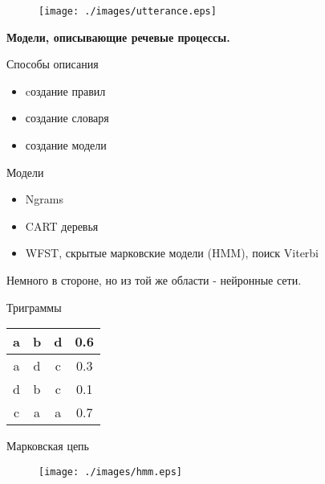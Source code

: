 \documentclass{seminar}
\begin{document}
\begin{slide}

\begin{figure}
\begin{center}
\texttt{[image: ./images/utterance.eps]}
\end{center}
\end{figure}

\end{slide}
\begin{slide}
    
{\bf Модели, описывающие речевые процессы.}

Способы описания

\begin{itemize}
\item cоздание правил
\item создание словаря
\item создание модели
\end{itemize}

Модели

\begin{itemize}
\item Ngrams
\item CART деревья
\item WFST, скрытые марковские модели (HMM), поиск Viterbi
\end{itemize}

Немного в стороне, но из той же области - нейронные сети.
\end{slide}
\begin{slide}
Триграммы

\begin{tabular}{|c|c|c|c|}
\hline
a & b & d & 0.6 \\
\hline
a & d & c & 0.3 \\
\hline
d & b & c & 0.1 \\
\hline
c & a & a & 0.7 \\
\hline
\end{tabular}

\end{slide}
\begin{slide}
Марковская цепь

\begin{figure}
\begin{center}
\texttt{[image: ./images/hmm.eps]}
\end{center}
\end{figure}

\end{slide}
\end{document}
